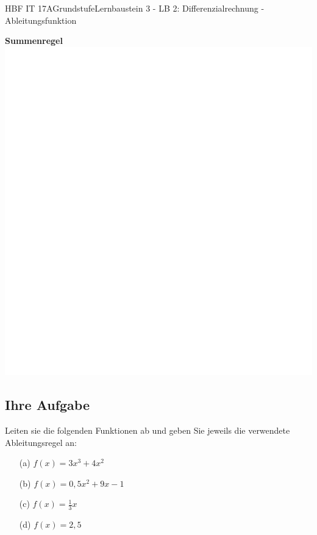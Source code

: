 \documentclass[11pt,twocolumn,oneside,openany,headings=optiontotoc,11pt,numbers=noenddot]{article}
\begin{document}
\begin{worksheet}{HBF IT 17A}{Grundstufe}{Lernbaustein 3 - LB 2: Differenzialrechnung - Ableitungsfunktion}
		\par
		\textbf{Summenregel}\\
		\includegraphics[scale=0.1]{../empty.jpg}\\
		\subsection*{Ihre Aufgabe}
		Leiten sie die folgenden Funktionen ab und geben Sie jeweils die verwendete Ableitungsregel an:
		\begin{itemize}
			\item[(a)] \(f(x) = 3x^3 + 4x^2\)
			\item[(b)] \(f(x) = 0,5x^2 + 9x - 1\)
			\item[(c)] \(f(x) = \frac{1}{3}x\)
			\item[(d)] \(f(x) = 2,5\)
		\end{itemize}		
	\end{worksheet}
\end{document}
